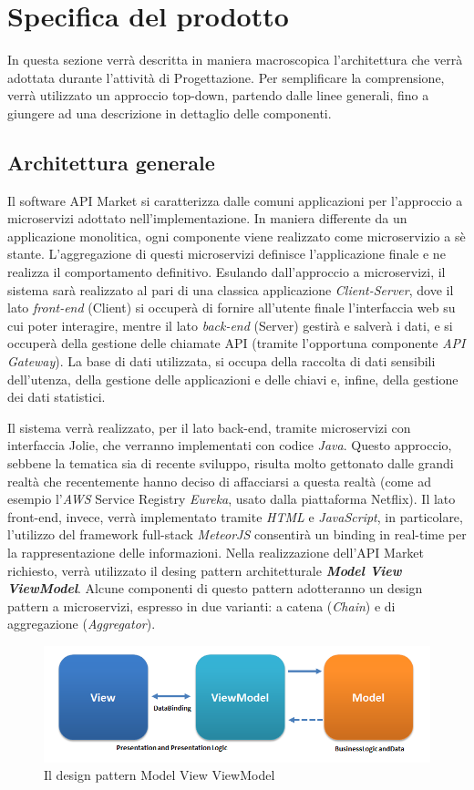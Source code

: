 \newpage
\section{Specifica del prodotto}
In questa sezione verrà descritta in maniera macroscopica l'architettura che verrà adottata durante l'attività di Progettazione. Per semplificare la comprensione, verrà utilizzato un approccio top-down, partendo dalle linee generali, fino a giungere ad una descrizione in dettaglio delle componenti.

\subsection{Architettura generale}
Il software API Market si caratterizza dalle comuni applicazioni per l'approccio a microservizi adottato nell'implementazione. In maniera differente da un applicazione monolitica, ogni componente viene realizzato come microservizio a sè stante. L'aggregazione di questi microservizi definisce l'applicazione finale e ne realizza il comportamento definitivo. Esulando dall'approccio a microservizi, il sistema sarà realizzato al pari di una classica applicazione \textit{Client-Server}, dove il lato \textit{front-end} (Client) si occuperà di fornire all'utente finale l'interfaccia web su cui poter interagire, mentre il lato \textit{back-end} (Server) gestirà e salverà i dati, e si occuperà della gestione delle chiamate API (tramite l'opportuna componente \textit{API Gateway}). La base di dati utilizzata, si occupa della raccolta di dati sensibili dell'utenza, della gestione delle applicazioni e delle chiavi e, infine, della gestione dei dati statistici.

Il sistema verrà realizzato, per il lato back-end, tramite microservizi con interfaccia Jolie, che verranno implementati con codice \textit{Java}. Questo approccio, sebbene la tematica sia di recente sviluppo, risulta molto gettonato dalle grandi realtà che recentemente hanno deciso di affacciarsi a questa realtà (come ad esempio l'\textit{AWS} Service Registry \textit{Eureka}, usato dalla piattaforma Netflix). Il lato front-end, invece, verrà implementato tramite \textit{HTML} e \textit{JavaScript}, in particolare, l'utilizzo del framework full-stack \textit{MeteorJS} consentirà un binding in real-time per la rappresentazione delle informazioni.
Nella realizzazione dell'API Market richiesto, verrà utilizzato il desing pattern architetturale \textbf{\textit{Model View ViewModel}}. Alcune componenti di questo pattern adotteranno un design pattern a microservizi, espresso in due varianti: a catena (\textit{Chain}) e di aggregazione (\textit{Aggregator}).
\begin{figure}[H]
	\centering
	\includegraphics[width=0.7\linewidth]{IMG/MVVMPattern}
	\caption{Il design pattern Model View ViewModel}
\end{figure}

